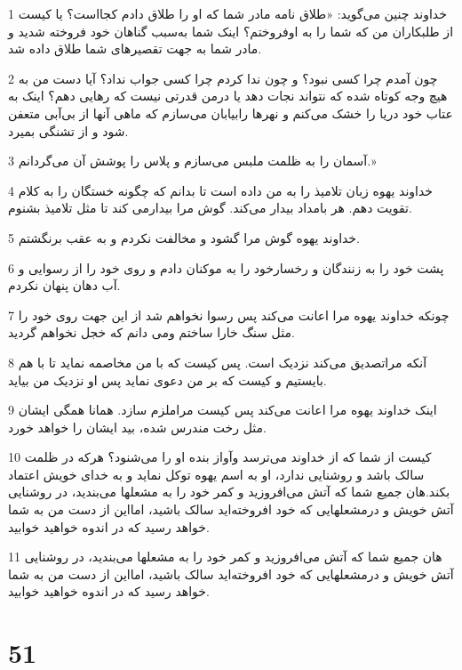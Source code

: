 \par 1 خداوند چنین می‌گوید: «طلاق نامه مادر شما که او را طلاق دادم کجااست؟ یا کیست از طلبکاران من که شما را به اوفروختم؟ اینک شما به‌سبب گناهان خود فروخته شدید و مادر شما به جهت تقصیرهای شما طلاق داده شد.
\par 2 چون آمدم چرا کسی نبود؟ و چون ندا کردم چرا کسی جواب نداد؟ آیا دست من به هیچ وجه کوتاه شده که نتواند نجات دهد یا درمن قدرتی نیست که رهایی دهم؟ اینک به عتاب خود دریا را خشک می‌کنم و نهرها رابیابان می‌سازم که ماهی آنها از بی‌آبی متعفن شود و از تشنگی بمیرد.
\par 3 آسمان را به ظلمت ملبس می‌سازم و پلاس را پوشش آن می‌گردانم.»
\par 4 خداوند یهوه زبان تلامیذ را به من داده است تا بدانم که چگونه خستگان را به کلام تقویت دهم. هر بامداد بیدار می‌کند. گوش مرا بیدارمی کند تا مثل تلامیذ بشنوم.
\par 5 خداوند یهوه گوش مرا گشود و مخالفت نکردم و به عقب برنگشتم.
\par 6 پشت خود را به زنندگان و رخسارخود را به موکنان دادم و روی خود را از رسوایی و آب دهان پنهان نکردم.
\par 7 چونکه خداوند یهوه مرا اعانت می‌کند پس رسوا نخواهم شد از این جهت روی خود را مثل سنگ خارا ساختم ومی دانم که خجل نخواهم گردید.
\par 8 آنکه مراتصدیق می‌کند نزدیک است. پس کیست که با من مخاصمه نماید تا با هم بایستیم و کیست که بر من دعوی نماید پس او نزدیک من بیاید.
\par 9 اینک خداوند یهوه مرا اعانت می‌کند پس کیست مراملزم سازد. همانا همگی ایشان مثل رخت مندرس شده، بید ایشان را خواهد خورد.
\par 10 کیست از شما که از خداوند می‌ترسد وآواز بنده او را می‌شنود؟ هرکه در ظلمت سالک باشد و روشنایی ندارد، او به اسم یهوه توکل نماید و به خدای خویش اعتماد بکند.هان جمیع شما که آتش می‌افروزید و کمر خود را به مشعلها می‌بندید، در روشنایی آتش خویش و درمشعلهایی که خود افروخته‌اید سالک باشید، امااین از دست من به شما خواهد رسید که در اندوه خواهید خوابید.
\par 11 هان جمیع شما که آتش می‌افروزید و کمر خود را به مشعلها می‌بندید، در روشنایی آتش خویش و درمشعلهایی که خود افروخته‌اید سالک باشید، امااین از دست من به شما خواهد رسید که در اندوه خواهید خوابید.
 
\chapter{51}

